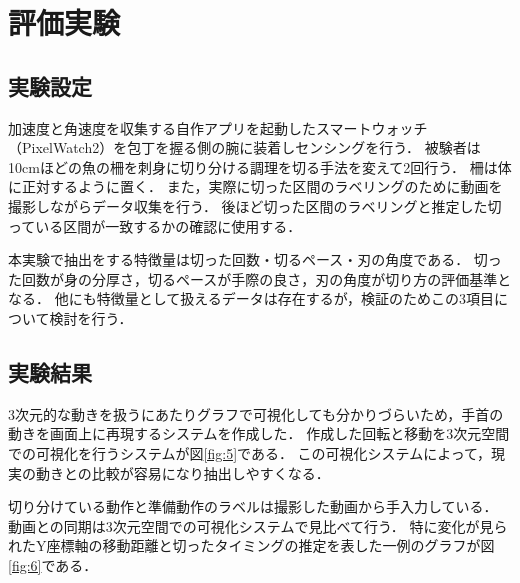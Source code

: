 \section{評価実験}
\subsection{実験設定}
加速度と角速度を収集する自作アプリを起動したスマートウォッチ（PixelWatch2）を包丁を握る側の腕に装着しセンシングを行う．
被験者は10cmほどの魚の柵を刺身に切り分ける調理を切る手法を変えて2回行う．
柵は体に正対するように置く．
また，実際に切った区間のラベリングのために動画を撮影しながらデータ収集を行う．
後ほど切った区間のラベリングと推定した切っている区間が一致するかの確認に使用する．

本実験で抽出をする特徴量は切った回数・切るペース・刃の角度である．
切った回数が身の分厚さ，切るペースが手際の良さ，刃の角度が切り方の評価基準となる．
他にも特徴量として扱えるデータは存在するが，検証のためこの3項目について検討を行う．
\subsection{実験結果}

3次元的な動きを扱うにあたりグラフで可視化しても分かりづらいため，手首の動きを画面上に再現するシステムを作成した．
作成した回転と移動を3次元空間での可視化を行うシステムが図\ref{fig:5}である．
この可視化システムによって，現実の動きとの比較が容易になり抽出しやすくなる．

切り分けている動作と準備動作のラベルは撮影した動画から手入力している．
動画との同期は3次元空間での可視化システムで見比べて行う．
特に変化が見られたY座標軸の移動距離と切ったタイミングの推定を表した一例のグラフが図\ref{fig:6}である．

